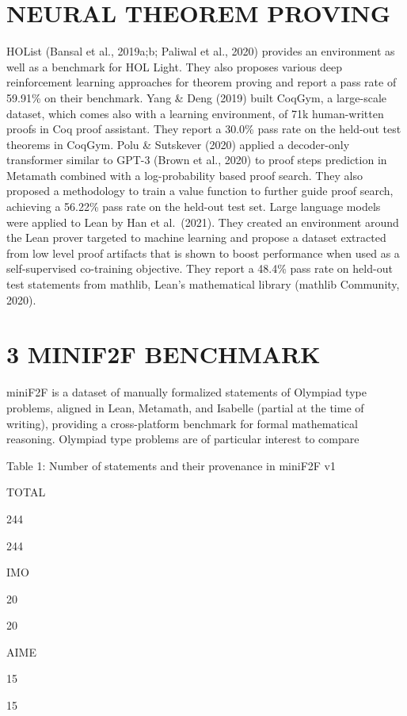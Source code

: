\documentclass[
]{article}
\begin{document}
\section{NEURAL THEOREM PROVING}\label{neural-theorem-proving}

HOList (Bansal et al., 2019a;b; Paliwal et al., 2020) provides an
environment as well as a benchmark for HOL Light. They also proposes
various deep reinforcement learning approaches for theorem proving and
report a pass rate of 59.91\% on their benchmark. Yang \& Deng (2019)
built CoqGym, a large-scale dataset, which comes also with a learning
environment, of 71k human-written proofs in Coq proof assistant. They
report a 30.0\% pass rate on the held-out test theorems in CoqGym. Polu
\& Sutskever (2020) applied a decoder-only transformer similar to GPT-3
(Brown et al., 2020) to proof steps prediction in Metamath combined with
a log-probability based proof search. They also proposed a methodology
to train a value function to further guide proof search, achieving a
56.22\% pass rate on the held-out test set. Large language models were
applied to Lean by Han et al.~(2021). They created an environment around
the Lean prover targeted to machine learning and propose a dataset
extracted from low level proof artifacts that is shown to boost
performance when used as a self-supervised co-training objective. They
report a 48.4\% pass rate on held-out test statements from mathlib,
Lean's mathematical library (mathlib Community, 2020).

\section{3 MINIF2F BENCHMARK}\label{minif2f-benchmark}

miniF2F is a dataset of manually formalized statements of Olympiad type
problems, aligned in Lean, Metamath, and Isabelle (partial at the time
of writing), providing a cross-platform benchmark for formal
mathematical reasoning. Olympiad type problems are of particular
interest to compare

Table 1: Number of statements and their provenance in miniF2F v1

TOTAL

244

244

IMO

20

20

AIME

15

15
\end{document}
